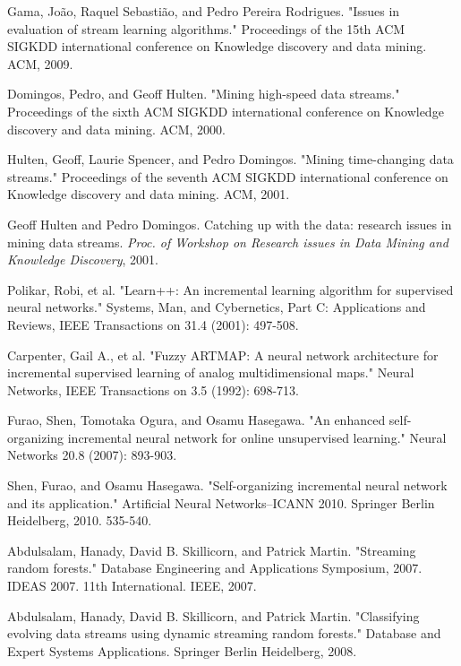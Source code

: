 \documentclass[conference]{IEEEtran}
\begin{document}
		
		\begin{thebibliography}{9}
			Gama, João, Raquel Sebastião, and Pedro Pereira  Rodrigues. "Issues in evaluation of stream learning algorithms." Proceedings of the 15th ACM SIGKDD international conference on Knowledge discovery and data mining. ACM, 2009.
			
			Domingos, Pedro, and Geoff Hulten. "Mining high-speed data streams." Proceedings of the sixth ACM SIGKDD international conference on Knowledge discovery and data mining. ACM, 2000.
			
			Hulten, Geoff, Laurie Spencer, and Pedro Domingos. "Mining time-changing data streams." Proceedings of the seventh ACM SIGKDD international conference on Knowledge discovery and data mining. ACM, 2001.
			
			Geoff Hulten and Pedro Domingos. Catching up with the data: research issues in mining data streams. \textit{Proc. of Workshop on Research issues in Data Mining and Knowledge Discovery}, 2001.
			
			Polikar, Robi, et al. "Learn++: An incremental learning algorithm for supervised neural networks." Systems, Man, and Cybernetics, Part C: Applications and Reviews, IEEE Transactions on 31.4 (2001): 497-508.
			
			Carpenter, Gail A., et al. "Fuzzy ARTMAP: A neural network architecture for incremental supervised learning of analog multidimensional maps." Neural Networks, IEEE Transactions on 3.5 (1992): 698-713.
			
			Furao, Shen, Tomotaka Ogura, and Osamu Hasegawa. "An enhanced self-organizing incremental neural network for online unsupervised learning." Neural Networks 20.8 (2007): 893-903.
			
			Shen, Furao, and Osamu Hasegawa. "Self-organizing incremental neural network and its application." Artificial Neural Networks–ICANN 2010. Springer Berlin Heidelberg, 2010. 535-540.
			
			Abdulsalam, Hanady, David B. Skillicorn, and Patrick Martin. "Streaming random forests." Database Engineering and Applications Symposium, 2007. IDEAS 2007. 11th International. IEEE, 2007.
			
			Abdulsalam, Hanady, David B. Skillicorn, and Patrick Martin. "Classifying evolving data streams using dynamic streaming random forests." Database and Expert Systems Applications. Springer Berlin Heidelberg, 2008.
			

\end{thebibliography}
\end{document}
